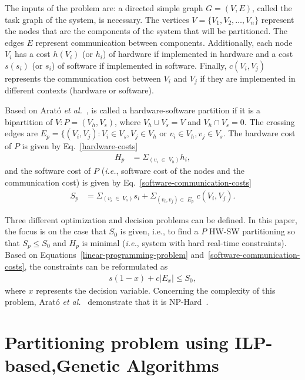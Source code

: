 The inputs of the problem are: a directed simple graph $ G = (V,E) $, called the task graph of the system, is necessary. The vertices $V = \{V_1,V_2,\dotso,V_n\}$ represent the nodes that are the components of the system that will be partitioned. The edges $E$ represent communication between components. Additionally, each node  $V_i$ has a cost $h(V_i)$ (or $h_i$) of hardware if implemented in hardware and a cost $s(s_i)$ (or $ s_i $) of software if implemented in software. Finally, $c(V_i,V_j)$ represents the communication cost between $V_i$ and $V_j$ if they are implemented in different contexts (hardware or software).

Based on Arat\'o {\it et al.}~\cite{Arato2003}, is called a hardware-software partition if it is a bipartition of $V:P = (V_h, V_s)$, where $V_h \cup V_s = V$  and $V_h \cap V_s = 0$. The crossing edges are $E_p = \{(V_i,V_j):V_i \in V_s, V_j \in V_h$ or $v_i \in V_h, v_j \in V_s $. The hardware cost of $P$ is given by Eq.~\ref{hardware-costs}
%
\begin{align}
\label{hardware-costs}
 H_p &= \Sigma_{\left(v_i \;\in\; V_h\right)} h_i,
\end{align}
%
\noindent and the software cost of $P$ ({\it i.e.}, software cost of the nodes and the communication cost) is given by Eq.~\ref{software-communication-costs}
%
\begin{align}
\label{software-communication-costs}
  S_p &= \Sigma_{\left(v_i \;\in\; V_s\right)} s_i + \Sigma_{(v_i,v_j) \in\; E_p}\; c(V_i, V_j).
\end{align}

Three different optimization and decision problems can be defined. In this paper, the focus is on the case that $ S_0 $ is given, i.e., to find a $P$ HW-SW partitioning so that $ S_p \leq S_0 $ and $ H_p $ is minimal ({\it i.e.}, system with hard real-time constraints). Based on Equations~\ref{linear-programming-problem} and~\ref{software-communication-costs}, the constraints can be reformulated as 
%
\begin{align}
\label{hw-sw-partitioning}
s\left(1-x\right) + c|E_x| \leq S_0, 
\end{align}
%
\noindent where $x$ represents the decision variable. Concerning the complexity of this problem, Arat\'o {\it et al.}~\cite{Arato2003} demonstrate that it is NP-Hard~\cite{Cormem}.

\section{Partitioning problem using ILP-based,Genetic Algorithms}
\label{ILPGA}

